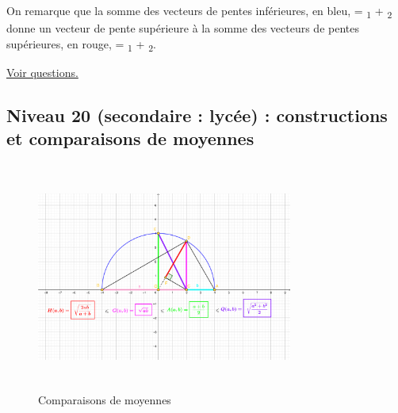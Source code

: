 \documentclass[11pt]{article}
\begin{document}
On remarque que la somme des vecteurs de pentes inférieures, en bleu, 
 = \textsubscript{1} + \textsubscript{2} donne un vecteur
de pente supérieure à la somme des vecteurs de pentes supérieures, en
rouge,  = \textsubscript{1} + \textsubscript{2}.




\hyperref[org28cf025]{Voir questions.}


\newpage


\subsection{Niveau 20 (secondaire : lycée) : constructions et comparaisons de moyennes}
\label{sec:org1fc65b9}

\label{org1773b9c}


\begin{figure}[htbp]
\centering
\includegraphics[width=0.75\textwidth,height=7.5cm]{./images/compare-means.png}
\caption{Comparaisons de moyennes}
\end{figure}

\label{org8248915}

\newpage
\end{document}
